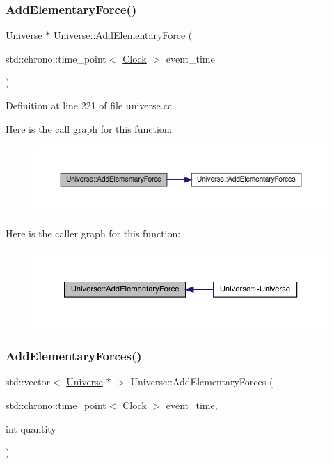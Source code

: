 \subsubsection{\texorpdfstring{Add\+Elementary\+Force()}{AddElementaryForce()}}
{\footnotesize\ttfamily \hyperlink{class_universe}{Universe} $\ast$ Universe\+::\+Add\+Elementary\+Force (\begin{DoxyParamCaption}\item[{std\+::chrono\+::time\+\_\+point$<$ \hyperlink{universe_8h_a0ef8d951d1ca5ab3cfaf7ab4c7a6fd80}{Clock} $>$}]{event\+\_\+time }\end{DoxyParamCaption})}



Definition at line 221 of file universe.\+cc.

Here is the call graph for this function\+:
\nopagebreak
\begin{figure}[H]
\begin{center}
\leavevmode
\includegraphics[width=350pt]{class_universe_a90c573dec55f2b3ad5680015356f5f25_cgraph}
\end{center}
\end{figure}
Here is the caller graph for this function\+:
\nopagebreak
\begin{figure}[H]
\begin{center}
\leavevmode
\includegraphics[width=350pt]{class_universe_a90c573dec55f2b3ad5680015356f5f25_icgraph}
\end{center}
\end{figure}
\mbox{\label{class_universe_a81d294300346e9f901836ab609cce942}} 
\subsubsection{\texorpdfstring{Add\+Elementary\+Forces()}{AddElementaryForces()}}
{\footnotesize\ttfamily std\+::vector$<$ \hyperlink{class_universe}{Universe} $\ast$ $>$ Universe\+::\+Add\+Elementary\+Forces (\begin{DoxyParamCaption}\item[{std\+::chrono\+::time\+\_\+point$<$ \hyperlink{universe_8h_a0ef8d951d1ca5ab3cfaf7ab4c7a6fd80}{Clock} $>$}]{event\+\_\+time,  }\item[{int}]{quantity }\end{DoxyParamCaption})}



